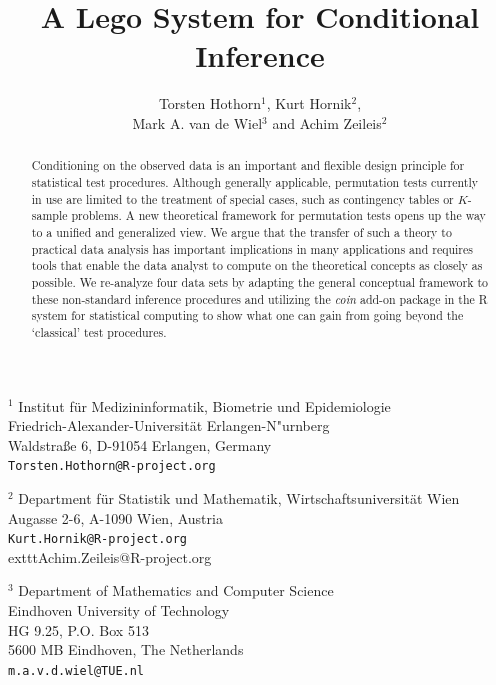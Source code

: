 \documentclass{article}
\newcommand{\Rpackage}[1]{\textit{#1}}
\newcommand{\RR}{\textsf{R}}
\begin{document}
\title{A Lego System for Conditional Inference}

\author{Torsten Hothorn$^1$, Kurt Hornik$^2$, \\ 
            Mark A. van de Wiel$^3$ and Achim Zeileis$^2$}

\date{}

\maketitle

\thispagestyle{empty}

\noindent$^1$ Institut f\"ur Medizininformatik, Biometrie und Epidemiologie\\
           Friedrich-Alexander-Universit\"at Erlangen-N"urnberg\\
           Waldstra{\ss}e 6, D-91054 Erlangen, Germany \\
           \texttt{Torsten.Hothorn@R-project.org}
         \newline

         \noindent$^2$ Department f\"ur Statistik und Mathematik,
            Wirtschaftsuniversit\"at Wien \\
            Augasse 2-6, A-1090 Wien, Austria \\
            \texttt{Kurt.Hornik@R-project.org} \\
            	exttt{Achim.Zeileis@R-project.org}
         \newline

         \noindent$^3$ Department of Mathematics and Computer Science \\
            Eindhoven University of Technology \\
            HG 9.25, P.O. Box 513 \\
            5600 MB Eindhoven, The Netherlands \\
            \texttt{m.a.v.d.wiel@TUE.nl}
         \newline

\begin{abstract}
Conditioning on the observed data is an important and flexible 
design principle for statistical test procedures. Although generally
applicable, permutation tests currently in use are limited to 
the treatment of special cases, such as contingency tables or $K$-sample
problems. A new theoretical framework for permutation
tests opens up the way to a unified and generalized view. We argue that the
transfer of such a theory to practical data analysis has important
implications in many applications and requires tools that enable the
data analyst to compute on the theoretical concepts as closely as possible.
We re-analyze four data sets
by adapting the general conceptual framework to these non-standard inference procedures
and
utilizing the \Rpackage{coin} add-on package in the \RR{} system for statistical computing
to show what one can gain from going beyond the `classical' test procedures.
\end{abstract}
\end{document}

